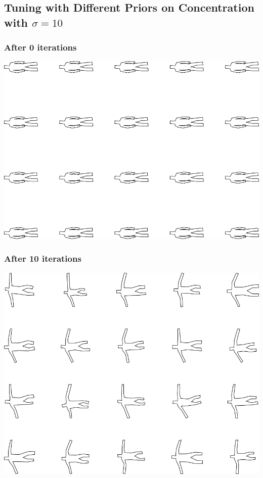 \subsection{Tuning with Different Priors on Concentration with $\sigma=10$}

\subsubsection{After 0 iterations}

\includegraphics[width=6in]{output/3.learning/concentration/concentration_psw10_iter0_.png}
\subsubsection{After 10 iterations}

\includegraphics[width=6in]{output/3.learning/concentration/concentration_psw10_iter10_.png}
